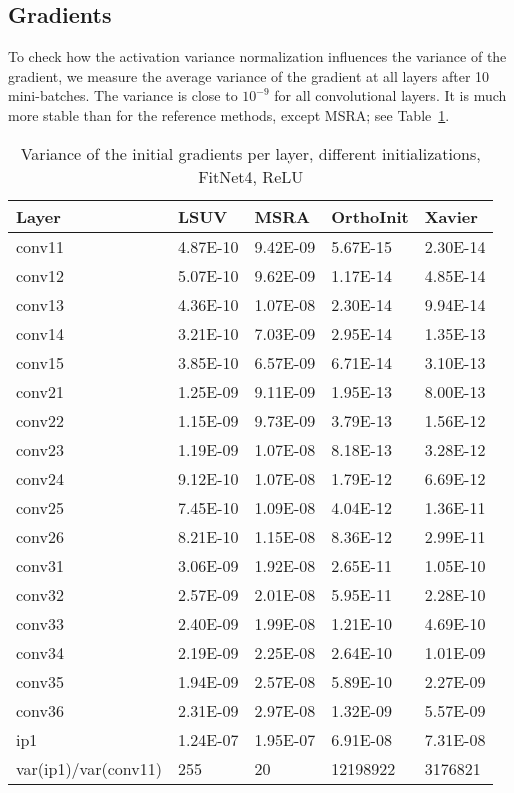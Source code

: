 \documentclass{article} \clearpage{}\usepackage{iclr2016_conference,times}
\begin{document}
\subsection{Gradients}
To check how the activation variance normalization influences the variance of the gradient, we measure the average variance of the gradient at all layers after 10 mini-batches. The variance is close to $10^{-9}$ for all convolutional layers. It is much more stable than for the reference methods, except MSRA; see Table~\ref{tab:grad-var}. 
\begin{table}[htb]
\caption{Variance of the initial gradients per layer, different initializations, FitNet4, ReLU}
\label{tab:grad-var}
\centering
\begin{tabular}{lllll}
\hline
Layer&LSUV&MSRA&OrthoInit&Xavier\\
\hline
conv11&4.87E-10&9.42E-09&5.67E-15&2.30E-14\\
conv12&5.07E-10&9.62E-09&1.17E-14&4.85E-14\\
conv13&4.36E-10&1.07E-08&2.30E-14&9.94E-14\\
conv14&3.21E-10&7.03E-09&2.95E-14&1.35E-13\\
conv15&3.85E-10&6.57E-09&6.71E-14&3.10E-13\\
\hline
conv21&1.25E-09&9.11E-09&1.95E-13&8.00E-13\\
conv22&1.15E-09&9.73E-09&3.79E-13&1.56E-12\\
conv23&1.19E-09&1.07E-08&8.18E-13&3.28E-12\\
conv24&9.12E-10&1.07E-08&1.79E-12&6.69E-12\\
conv25&7.45E-10&1.09E-08&4.04E-12&1.36E-11\\
conv26&8.21E-10&1.15E-08&8.36E-12&2.99E-11\\
\hline
conv31&3.06E-09&1.92E-08&2.65E-11&1.05E-10\\
conv32&2.57E-09&2.01E-08&5.95E-11&2.28E-10\\
conv33&2.40E-09&1.99E-08&1.21E-10&4.69E-10\\
conv34&2.19E-09&2.25E-08&2.64E-10&1.01E-09\\
conv35&1.94E-09&2.57E-08&5.89E-10&2.27E-09\\
conv36&2.31E-09&2.97E-08&1.32E-09&5.57E-09\\
\hline
ip1&1.24E-07&1.95E-07&6.91E-08&7.31E-08\\
\hline
var(ip1)/var(conv11)&255&20&12198922&3176821\\
\hline
\end{tabular}
\end{table}
\end{document}
